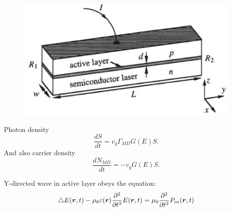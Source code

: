 \begin{minipage}{0.45\textwidth}
    \begin{figure}[h]
    \centering
    \includegraphics[width=1.1\textwidth]{images/semi_medium.png}
\end{figure}
\end{minipage}
\hfill
\begin{minipage}{0.49\textwidth}
	Photon density
    \begin{equation}
	\frac{d S}{d t} = v_g \Gamma_{MD} G(E) S.
	\end{equation}
	And also carrier density
	\begin{equation}
	\frac{d N_{MD}}{d t} = - v_g G(E) S.
\end{equation}
\end{minipage}

\phantom{239}

Y-directed wave in active layer obeys the equation:
\begin{equation}
	\triangle E(\mbox{\boldmath $r$},t) - \mu_0 \varepsilon(\mbox{\boldmath $r$}) \frac{\partial^2}{\partial t^2} E(\mbox{\boldmath $r$}, t) = \mu_0 \frac{\partial^2}{\partial t^2} P_{in}(\mbox{\boldmath $r$},t)
	\label{1.46}
\end{equation}

